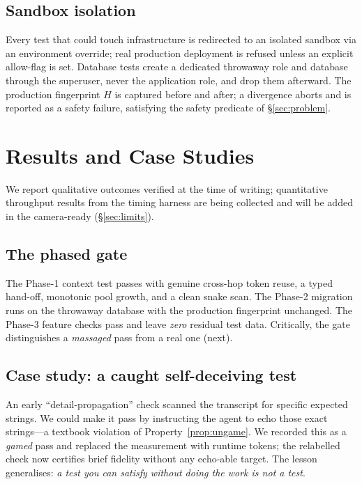 \documentclass[10pt,twocolumn]{article}
\begin{document}
\subsection{Sandbox isolation}\label{sec:safety}
Every test that could touch infrastructure is redirected to an isolated
sandbox via an environment override; real production deployment is refused
unless an explicit allow-flag is set. Database tests create a dedicated
throwaway role and database through the superuser, never the application role,
and drop them afterward. The production fingerprint $H$ is captured before and
after; a divergence aborts and is reported as a safety failure, satisfying the
safety predicate of \S\ref{sec:problem}.

\section{Results and Case Studies}\label{sec:results}
We report qualitative outcomes verified at the time of writing; quantitative
throughput results from the timing harness are being collected and will be
added in the camera-ready (\S\ref{sec:limits}).

\subsection{The phased gate}
The Phase-1 context test passes with genuine cross-hop token reuse, a typed
hand-off, monotonic pool growth, and a clean snake scan. The Phase-2 migration
runs on the throwaway database with the production fingerprint unchanged. The
Phase-3 feature checks pass and leave \emph{zero} residual test data. Critically,
the gate distinguishes a \emph{massaged} pass from a real one (next).

\subsection{Case study: a caught self-deceiving test}
An early ``detail-propagation'' check scanned the transcript for specific
expected strings. We could make it pass by instructing the agent to echo those
exact strings---a textbook violation of Property~\ref{prop:ungame}. We recorded
this as a \emph{gamed} pass and replaced the measurement with runtime tokens;
the relabelled check now certifies brief fidelity without any echo-able target.
The lesson generalises: \emph{a test you can satisfy without doing the work is
not a test}.
\end{document}
